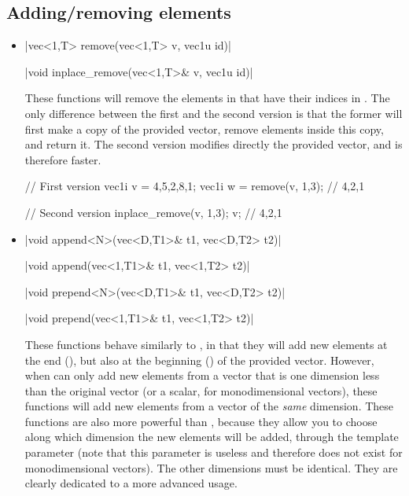 \documentclass[12pt]{report}
\newenvironment{example}
{
    \begin{mdframed}[style=example,frametitle={Example}]
}
{
    \end{mdframed}
}
\begin{document}
\subsection{Adding/removing elements}

\begin{itemize}
\item \cppinline|vec<1,T> remove(vec<1,T> v, vec1u id)| 

\cppinline|void inplace_remove(vec<1,T>& v, vec1u id)| 

These functions will remove the elements in  that have their indices in . The only difference between the first and the second version is that the former will first make a copy of the provided vector, remove elements inside this copy, and return it. The second version modifies directly the provided vector, and is therefore faster.

\begin{example}
\begin{cppcode}
// First version
vec1i v = {4,5,2,8,1};
vec1i w = remove(v, {1,3}); // {4,2,1}

// Second version
inplace_remove(v, {1,3});
v; // {4,2,1}
\end{cppcode}
\end{example}

\item \cppinline|void append<N>(vec<D,T1>& t1, vec<D,T2> t2)| 

\cppinline|void append(vec<1,T1>& t1, vec<1,T2> t2)|

\cppinline|void prepend<N>(vec<D,T1>& t1, vec<D,T2> t2)| 

\cppinline|void prepend(vec<1,T1>& t1, vec<1,T2> t2)|

These functions behave similarly to , in that they will add new elements at the end (), but also at the beginning () of the provided vector. However, when  can only add new elements from a vector that is one dimension less than the original vector (or a scalar, for monodimensional vectors), these functions will add new elements from a vector of the \emph{same} dimension. These functions are also more powerful than , because they allow you to choose along which dimension the new elements will be added, through the template parameter  (note that this parameter is useless and therefore does not exist for monodimensional vectors). The other dimensions must be identical. They are clearly dedicated to a more advanced usage.


\end{itemize}
\end{document}
